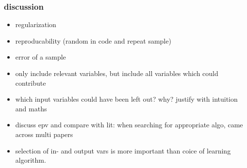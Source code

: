 \subsubsection{discussion}
\begin{itemize}
    \item regularization
    \item reproducability (random in code and repeat sample)
    \item error of a sample 
    \item only include relevant variables\cite{gunst2007fractional}, but include all variables which could contribute\cite{haertler2014statistisch}
    \item which input variables could have been left out? why? justify with intuition and maths
    \item discuss epv and compare with lit: when searching for appropriate algo, came across multi papers 
    \item selection of in- and output vars is more important than coice of learning algorithm. 

\end{itemize}
